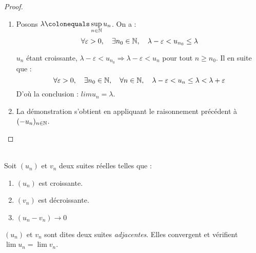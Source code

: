     \begin{proof}
        \ \\
        \begin{enumerate}[label=(\roman*)]
            \item Posons \(\lambda\colonequals\sup\limits_{n\in\naturals}u_n\). On a : 
            \[
            \forall \varepsilon > 0, \quad \exists n_0 \in \mathbb{N}, \quad \lambda - \varepsilon < u_{n_0} \le \lambda    
            \]
            
            \(u_n\) étant croissante, \(\lambda - \varepsilon < u_{n_0} \Rightarrow \lambda - \varepsilon < u_{n}\) pour tout \(n\ge n_0\).
            Il en suite que :
            \[
            \forall \varepsilon > 0, \quad \exists n_0 \in \mathbb{N}, \quad \forall n\in \mathbb{N}, \quad \lambda - \varepsilon < u_{n} \le \lambda < \lambda + \varepsilon
            \]
            D'où la conclusion : \(lim u_n = \lambda\).

            \item La démonstration s'obtient en appliquant le raisonnement précédent à \((-u_n)_{n\in\mathbb{N}}\).
        \end{enumerate}
    \end{proof}

    \begin{thedef}\ \\
        \label{thm:suites_adjacentes}
        Soit \((u_n)\) et \(v_n\) deux suites réelles telles que :
        \begin{enumerate}[label=\(\alph*\).]
            \item \((u_n)\) est croissante.
            \item \((v_n)\) est décroissante.
            \item \((u_n - v_n) \to 0\)
        \end{enumerate}
        \((u_n)\) et \(v_n\) sont dites deux suites \emph{adjacentes}. Elles convergent et vérifient \(\lim u_n =  \lim v_n\).
    \end{thedef}